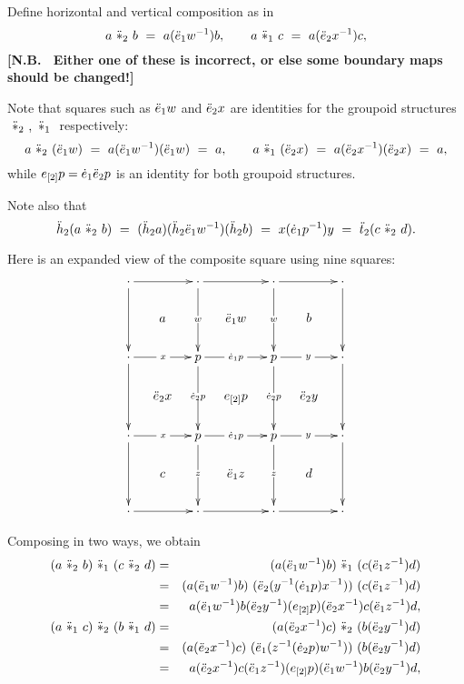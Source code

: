 \noindent
Define horizontal and vertical composition as in 
$$
a ~\ddot{\ast}_2~ b ~=~ a(\ddot{e}_1 w^{-1})b, \qquad
a ~\ddot{\ast}_1~ c ~=~ a(\ddot{e}_2 x^{-1})c,
$$
{\bf [N.B.~ Either one of these is incorrect, 
or else some boundary maps should be changed!]}

\bigskip\noindent
Note that squares such as $\ddot{e}_1 w$ and $\ddot{e}_2 x$ are identities for 
the groupoid structures $~\ddot{\ast}_2~,~\ddot{\ast}_1~$ respectively:
$$
a ~\ddot{\ast}_2~ (\ddot{e}_1 w) ~=~ a(\ddot{e}_1 w^{-1})(\ddot{e}_1 w) ~=~ a, 
\qquad
a ~\ddot{\ast}_1~ (\ddot{e}_2 x) ~=~ a(\ddot{e}_2 x^{-1})(\ddot{e}_2 x) ~=~ a, 
$$
while $e_{[2]}p = \dot{e}_1\ddot{e}_2 p$ is an identity for both groupoid structures. 

\bigskip\noindent
Note also that
$$
\ddot{h}_2(a ~\ddot{\ast}_2~ b) ~=~ (\ddot{h}_2 a)(\ddot{h}_2\ddot{e}_1 w^{-1})(\ddot{h}_2 b) 
                    ~=~ x(\dot{e}_1 p^{-1})y 
                    ~=~ \ddot{t}_2( c ~\ddot{\ast}_2~ d).
$$

\bigskip\noindent
Here is an expanded view of the composite square using nine squares: 
$$
\xymatrix  @C=1.0pc @R=1.4pc{
\cdot \ar[rr] \ar[dd]
  &   & \cdot \ar[rr] \ar[dd]|{\phantom{gZ}w\phantom{gZ}}
          &   & \cdot \ar[rr] \ar[dd]|{\phantom{gZ}w\phantom{gZ}} 
                  &   & \cdot \ar[dd] \\
  & a &   & \ddeeo w 
              &   & b &  \\
\cdot \ar[rr]|{~x~} \ar[dd] 
  &   & p \ar[rr]|{~\deeo p~} 
          \ar[dd]|{\phantom{gZ} \deet p \phantom{gZ}}
          &   & p \ar[rr]|{~y~} 
                  \ar[dd]|{\phantom{gZ} \deet p \phantom{gZ}}
                  &   & \cdot \ar[dd] \\
  & \ddeet x 
      &   & e_{[2]} p 
              &   & \ddeet y 
                      &  \\
\cdot \ar[rr]|{~x~} \ar[dd]
  &   & p \ar[rr]|{~\deeo p~} 
          \ar[dd]|{\phantom{gZ}z\phantom{gZ}}
          &   & p \ar[rr]|{~y~} \ar[dd]|{\phantom{gZ}z\phantom{gZ}}
                  &   & \cdot \ar[dd] \\
  & c &   & \ddeeo z 
              &   & d &  \\
\cdot \ar[rr] 
  &   & \cdot \ar[rr] 
          &   & \cdot \ar[rr]
                  &   &  \cdot \\
}
$$

\bigskip\noindent
Composing in two ways, we obtain
\begin{eqnarray*}
(a ~\ddot{\ast}_2~ b) ~\ddot{\ast}_1~ (c ~\ddot{\ast}_2~ d) 
 &=& (a(\ddot{e}_1 w^{-1})b) ~\ddot{\ast}_1~ (c(\ddot{e}_1 z^{-1})d) \\
 &=& (a(\ddot{e}_1 w^{-1})b) 
        ~(\ddot{e}_2 (y^{-1}(\dot{e}_1 p)x^{-1})) 
           ~(c(\ddot{e}_1 z^{-1})d) \\
 &=& a(\ddot{e}_1 w^{-1})b
         (\ddot{e}_2 y^{-1})(e_{[2]} p)(\ddot{e}_2 x^{-1})
              c(\ddot{e}_1 z^{-1})d, \\
(a ~\ddot{\ast}_1~ c) ~\ddot{\ast}_2~ (b ~\ddot{\ast}_1~ d) 
 &=& (a(\ddot{e}_2 x^{-1})c) ~\ddot{\ast}_2~ (b(\ddot{e}_2 y^{-1})d) \\
 &=& (a(\ddot{e}_2 x^{-1})c) 
        ~(\ddot{e}_1 (z^{-1}(\dot{e}_2 p)w^{-1})) 
           ~(b(\ddot{e}_2 y^{-1})d) \\
 &=& a(\ddot{e}_2 x^{-1})c
         (\ddot{e}_1 z^{-1})(e_{[2]} p)(\ddot{e}_1 w^{-1})
              b(\ddot{e}_2 y^{-1})d, \\
\end{eqnarray*}

